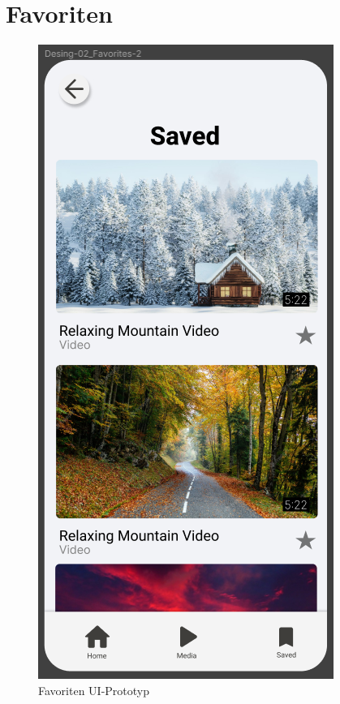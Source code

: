 \section{Favoriten}

\begin{figure}[H]
    \centering
    \includegraphics[height=\textwidth]{./pics/pFavoriten.png}
    \caption{Favoriten UI-Prototyp}
\end{figure}

